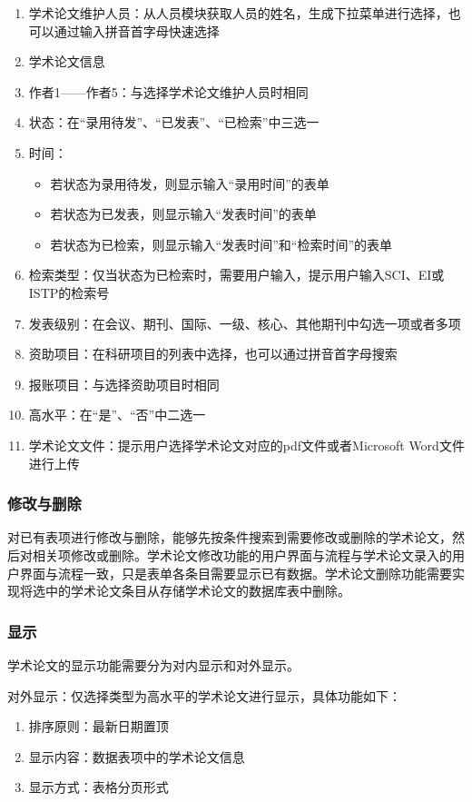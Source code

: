 \begin{enumerate}
\item 学术论文维护人员：从人员模块获取人员的姓名，生成下拉菜单进行选择，也可以通过输入拼音首字母快速选择
\item 学术论文信息
\item 作者1——作者5：与选择学术论文维护人员时相同
\item 状态：在“录用待发”、“已发表”、“已检索”中三选一
\item 时间：
\begin{itemize}
	\item 若状态为录用待发，则显示输入“录用时间”的表单
	\item 若状态为已发表，则显示输入“发表时间”的表单
	\item 若状态为已检索，则显示输入“发表时间”和“检索时间”的表单
\end{itemize}
\item 检索类型：仅当状态为已检索时，需要用户输入，提示用户输入SCI、EI或ISTP的检索号
\item 发表级别：在会议、期刊、国际、一级、核心、其他期刊中勾选一项或者多项
\item 资助项目：在科研项目的列表中选择，也可以通过拼音首字母搜索
\item 报账项目：与选择资助项目时相同
\item 高水平：在“是”、“否”中二选一
\item 学术论文文件：提示用户选择学术论文对应的pdf文件或者Microsoft Word文件进行上传
\end{enumerate}

\subsubsection{修改与删除}

对已有表项进行修改与删除，能够先按条件搜索到需要修改或删除的学术论文，然后对相关项修改或删除。学术论文修改功能的用户界面与流程与学术论文录入的用户界面与流程一致，只是表单各条目需要显示已有数据。学术论文删除功能需要实现将选中的学术论文条目从存储学术论文的数据库表中删除。


\subsubsection{显示}

学术论文的显示功能需要分为对内显示和对外显示。

对外显示：仅选择类型为高水平的学术论文进行显示，具体功能如下：

\begin{enumerate}
\item 排序原则：最新日期置顶
\item 显示内容：数据表项中的学术论文信息
\item 显示方式：表格分页形式
\end{enumerate}


